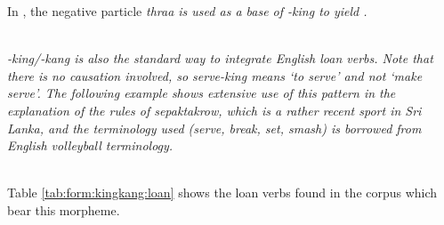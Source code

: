 In , the negative particle \em thraa \em is used as a base of \em -king \em to yield .

 \\
\em -king/-kang \em is also the standard way to integrate English loan verbs. Note that there is no causation involved, so \em serve-king \em means `to serve' and not `make serve'. The following example shows extensive use of this pattern in the explanation of the rules of sepaktakrow, which is a rather recent sport in Sri Lanka, and the terminology used (serve, break, set, smash) is borrowed from English volleyball terminology.


 \\
Table \ref{tab:form:kingkang:loan} shows the loan verbs found in the corpus which bear this morpheme.

